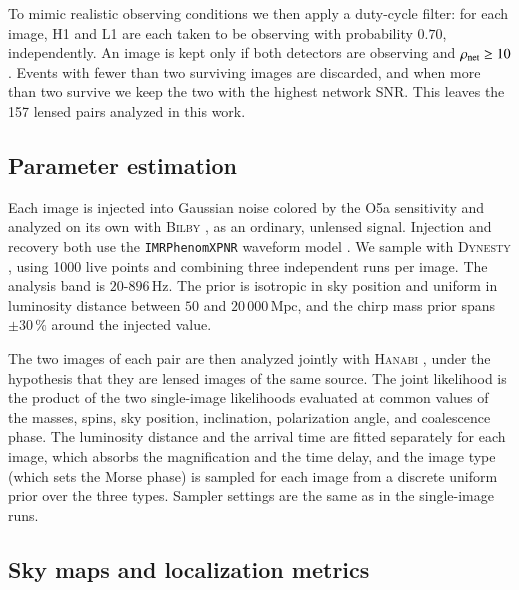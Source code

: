 \documentclass{aa}
\begin{document}
To mimic realistic observing conditions we then apply a duty-cycle filter:
for each image, H1 and L1 are each taken to be observing with probability
$0.70$, independently. An image is kept only if both detectors are
observing and $\rho_{\rm net} \geq 10$. Events with fewer than two
surviving images are discarded, and when more than two survive we keep the
two with the highest network SNR. This leaves the 157 lensed pairs
analyzed in this work.

\subsection{Parameter estimation}
\label{sec:pe}

Each image is injected into Gaussian noise colored by the O5a sensitivity
and analyzed on its own with \textsc{Bilby}
\citep{BILBY,bilby_pipe_paper}, as an ordinary, unlensed signal. Injection
and recovery both use the \texttt{IMRPhenomXPNR} waveform model
\citep{IMRPhenomXPNR}. We sample with \textsc{Dynesty} \citep{MCMC_vs_NS},
using 1000 live points and combining three independent runs per image. The
analysis band is $20$-$896\,\mathrm{Hz}$. The prior is isotropic in sky
position and uniform in luminosity distance between $50$ and
$20\,000\,\mathrm{Mpc}$, and the chirp mass prior spans $\pm 30\,\%$ around
the injected value.

The two images of each pair are then analyzed jointly with \textsc{Hanabi}
\citep{PE_lensing_bayes}, under the hypothesis that they are lensed images
of the same source. The joint likelihood is the product of the two
single-image likelihoods evaluated at common values of the masses, spins,
sky position, inclination, polarization angle, and coalescence phase. The
luminosity distance and the arrival time are fitted separately for each
image, which absorbs the magnification and the time delay, and the image
type (which sets the Morse phase) is sampled for each image from a discrete
uniform prior over the three types. Sampler settings are the same as in
the single-image runs.

\subsection{Sky maps and localization metrics}
\label{sec:skymaps}
\end{document}
